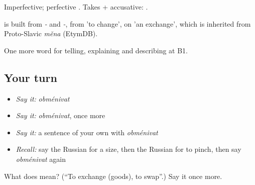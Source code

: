 Imperfective; perfective \emph{}. Takes \emph{} + accusative: \emph{    }.

\begin{cousinweb}
\emph{} is built from \emph{-} and \emph{-}, from \emph{} 'to change', on \emph{} 'an exchange', which is inherited from Proto-Slavic \emph{měna} (EtymDB).
\end{cousinweb}

\begin{grammarlens}[title={What you've built}]
One more word for telling, explaining and describing at B1.
\end{grammarlens}

\subsection*{Your turn}
\begin{itemize}
\raggedright
  \item \emph{Say it:} \emph{obménivat}
  \item \emph{Say it:} \emph{obménivat}, once more
  \item \emph{Say it:} a sentence of your own with \emph{obménivat}
  \item \emph{Recall:} say the Russian for a size, then the Russian for to pinch, then say \emph{obménivat} again
\end{itemize}

\begin{tcolorbox}[breakable,colback=teal!4,colframe=teal!35!black,title={Before you move on}]
What does  mean? (\textquotedblleft{}To exchange (goods), to swap\textquotedblright{}.) Say it once more.
\end{tcolorbox}
